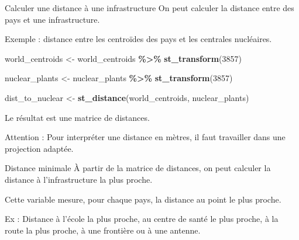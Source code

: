 \documentclass[
  10pt,
  ignorenonframetext,
]{beamer}
\newenvironment{Shaded}{\begin{snugshade}}{\end{snugshade}}
\newcommand{\DecValTok}[1]{\textcolor[rgb]{0.00,0.00,0.81}{#1}}
\newcommand{\FunctionTok}[1]{\textcolor[rgb]{0.13,0.29,0.53}{\textbf{#1}}}
\newcommand{\NormalTok}[1]{#1}
\newcommand{\OtherTok}[1]{\textcolor[rgb]{0.56,0.35,0.01}{#1}}
\newcommand{\SpecialCharTok}[1]{\textcolor[rgb]{0.81,0.36,0.00}{\textbf{#1}}}
\begin{document}
\begin{frame}[fragile]{Calculer une distance à une infrastructure}
\label{calculer-une-distance-uxe0-une-infrastructure}
On peut calculer la distance entre des pays et une infrastructure.

Exemple : distance entre les centroïdes des pays et les centrales
nucléaires.

\begin{Shaded}
\begin{Highlighting}[]
\NormalTok{world\_centroids }\OtherTok{\textless{}{-}}\NormalTok{ world\_centroids }\SpecialCharTok{\%\textgreater{}\%}
  \FunctionTok{st\_transform}\NormalTok{(}\DecValTok{3857}\NormalTok{)}

\NormalTok{nuclear\_plants }\OtherTok{\textless{}{-}}\NormalTok{ nuclear\_plants }\SpecialCharTok{\%\textgreater{}\%}
  \FunctionTok{st\_transform}\NormalTok{(}\DecValTok{3857}\NormalTok{)}

\NormalTok{dist\_to\_nuclear }\OtherTok{\textless{}{-}} \FunctionTok{st\_distance}\NormalTok{(world\_centroids, nuclear\_plants)}
\end{Highlighting}
\end{Shaded}

Le résultat est une matrice de distances.

Attention : Pour interpréter une distance en mètres, il faut travailler
dans une projection adaptée.
\end{frame}

\begin{frame}[fragile]{Distance minimale}
\label{distance-minimale}
À partir de la matrice de distances, on peut calculer la distance à
l'infrastructure la plus proche.

\begin{Shaded}
\end{Shaded}

Cette variable mesure, pour chaque pays, la distance au point le plus
proche.

Ex : Distance à l'école la plus proche, au centre de santé le plus
proche, à la route la plus proche, à une frontière ou à une antenne.
\end{frame}
\end{document}
